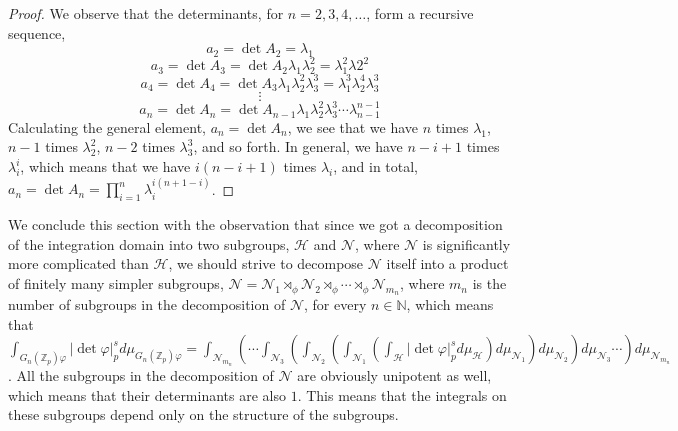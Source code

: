 \documentclass[12pt]{article}
\begin{document}
\begin{proof}
We observe that the determinants, for $n=2,3,4,\dots$, form a recursive sequence,
$$a_2=\det A_2=\lambda_1$$
$$a_3=\det A_3=\det A_2\lambda_1\lambda_2^2=\lambda_1^2\lambda2^2$$
$$a_4=\det A_4=\det A_3\lambda_1\lambda_2^2\lambda_3^3=\lambda_1^3\lambda_2^4\lambda_3^3$$
$$\vdots$$
$$a_n=\det A_n=\det A_{n-1}\lambda_1\lambda_2^2\lambda_3^3\cdots\lambda_{n-1}^{n-1}$$
Calculating the general element, $a_n=\det A_n$, we see that we have $n$ times $\lambda_1$, $n-1$ times $\lambda_2^2$, $n-2$ times $\lambda_3^3$, and so forth. In general, we have $n-i+1$ times $\lambda_i^i$, which means that we have $i(n-i+1)$ times $\lambda_i$, and in total, $a_n=\det A_n=\prod_{i=1}^n\lambda_i^{i(n+1-i)}$.
\end{proof}
We conclude this section with the observation that since we got a decomposition of the integration domain into two subgroups, $\mathcal{H}$ and $\mathcal{N}$, where $\mathcal{N}$ is significantly more complicated than $\mathcal{H}$, we should strive to decompose $\mathcal{N}$ itself into a product of finitely many simpler subgroups, $\mathcal{N}=\mathcal{N}_1\rtimes_{\phi}\mathcal{N}_2\rtimes_{\phi}\cdots\rtimes_{\phi}\mathcal{N}_{m_n}$, where $m_n$ is the number of subgroups in the decomposition of $\mathcal{N}$, for every $n\in\mathbb{N}$, which means that $\displaystyle\int_{G_n(\mathbb{Z}_p)\varphi}|\det\varphi|_p^sd\mu_{G_n(\mathbb{Z}_p)\varphi}=\displaystyle\int_{\mathcal{N}_{m_n}}\left(\cdots\displaystyle\int_{\mathcal{N}_3}\left(\displaystyle\int_{\mathcal{N}_2}\left(\displaystyle\int_{\mathcal{N}_1}\left(\displaystyle\int_{\mathcal{H}}|\det\varphi|_p^sd\mu_{\mathcal{H}}\right)d\mu_{\mathcal{N}_1}\right)d\mu_{\mathcal{N}_2}\right)d\mu_{\mathcal{N}_3}\cdots\right)d\mu_{\mathcal{N}_{m_n}}$. All the subgroups in the decomposition of $\mathcal{N}$ are obviously unipotent as well, which means that their determinants are also $1$. This means that the integrals on these subgroups depend only on the structure of the subgroups.
\end{document}
